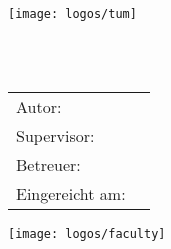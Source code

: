 \begin{titlepage}


	
  \centering

  \vspace{40mm}
  \texttt{[image: logos/tum]}

  \vspace{5mm}
  {\huge\MakeUppercase{\getFaculty{}}}\\

  \vspace{5mm}
  {\large\MakeUppercase{\getUniversity{}}}\\

  \vspace{20mm}
  {\large \getDoctype{}}

  \vspace{15mm}
  {\huge\bfseries \getTitle{}}
  
  \vspace{10mm}
  {\large\bfseries \getEngTitle{}}

  \vspace{15mm}
  \begin{tabular}{l l}
    Autor: & \getAuthor{} \\
    Supervisor: & \getSupervisor{} \\
    Betreuer: & \getAdvisor{} \\
    Eingereicht am: & \getSubmissionDate{} \\
  \end{tabular}

  \vspace{15mm}
  \texttt{[image: logos/faculty]}
\end{titlepage}
